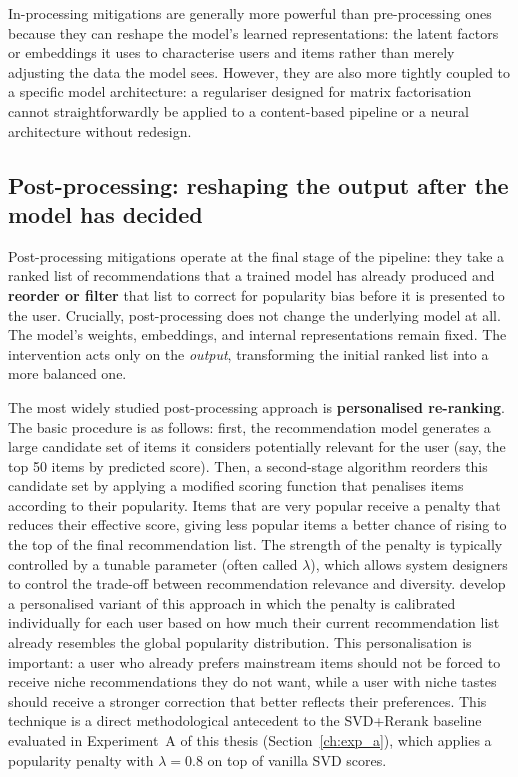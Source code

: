 \documentclass[11pt,a4paper]{report}
\begin{document}
In-processing mitigations are generally more powerful than pre-processing ones because they can reshape the model's learned representations: the latent factors or embeddings it uses to characterise users and items rather than merely adjusting the data the model sees. However, they are also more tightly coupled to a specific model architecture: a regulariser designed for matrix factorisation cannot straightforwardly be applied to a content-based pipeline or a neural architecture without redesign.

\subsection*{Post-processing: reshaping the output after the model has decided}

Post-processing mitigations operate at the final stage of the pipeline: they take a ranked list of recommendations that a trained model has already produced and \textbf{reorder or filter} that list to correct for popularity bias before it is presented to the user. Crucially, post-processing does not change the underlying model at all. The model's weights, embeddings, and internal representations remain fixed. The intervention acts only on the \emph{output}, transforming the initial ranked list into a more balanced one.

The most widely studied post-processing approach is \textbf{personalised re-ranking}. The basic procedure is as follows: first, the recommendation model generates a large candidate set of items it considers potentially relevant for the user (say, the top 50 items by predicted score). Then, a second-stage algorithm reorders this candidate set by applying a modified scoring function that penalises items according to their popularity. Items that are very popular receive a penalty that reduces their effective score, giving less popular items a better chance of rising to the top of the final recommendation list. The strength of the penalty is typically controlled by a tunable parameter (often called $\lambda$), which allows system designers to control the trade-off between recommendation relevance and diversity. \citet{abdollahpouri2019managing} develop a personalised variant of this approach in which the penalty is calibrated individually for each user based on how much their current recommendation list already resembles the global popularity distribution. This personalisation is important: a user who already prefers mainstream items should not be forced to receive niche recommendations they do not want, while a user with niche tastes should receive a stronger correction that better reflects their preferences. This technique is a direct methodological antecedent to the SVD+Rerank baseline evaluated in Experiment~A of this thesis (Section~\ref{ch:exp_a}), which applies a popularity penalty with $\lambda=0.8$ on top of vanilla SVD scores.
\end{document}
